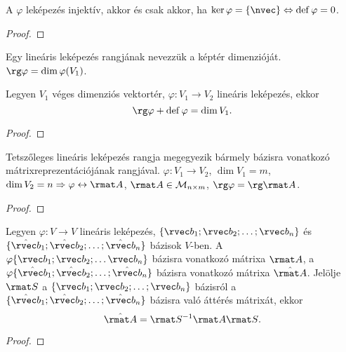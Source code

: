 \begin{statement}
  A $\varphi$ leképezés injektív, akkor és csak akkor, ha
  $\ker \varphi = \{ \nvec \} \Leftrightarrow \operatorname{def} \varphi = 0$.

  \begin{proof}
    \vspace{6em}
  \end{proof}
\end{statement}

\begin{definition}
  Egy lineáris leképezés rangjának nevezzük a képtér dimenzióját.
  $\rg \varphi = \dim \varphi(V_1)$.
\end{definition}

\begin{theorem}
  Legyen $V_1$ véges dimenziós vektortér, $\varphi: V_1 \rightarrow V_2$
  lineáris leképezés, ekkor
  $$
    \rg \varphi + \operatorname{def} \varphi = \dim V_1
    \text.
  $$

  \begin{proof}
    \vspace{6em}
  \end{proof}
\end{theorem}

\begin{statement}
  Tetszőleges lineáris leképezés rangja megegyezik bármely bázisra vonatkozó
  mátrixreprezentációjának rangjával. $\varphi: V_1 \rightarrow V_2$, $\dim V_1
    = m$, $\dim V_2 = n \Rightarrow \varphi \leftrightarrow \rmat A$, $\rmat A
    \in \mathcal M_{n \times m}$, $\rg \varphi = \rg \rmat A$.

  \begin{proof}
    \vspace{6em}
  \end{proof}
\end{statement}

\begin{theorem}
  Legyen $\varphi: V \rightarrow V$ lineáris leképezés,
  $\{ \rvec b_1; \rvec b_2; \ldots; \rvec b_n \}$ és $\{ \hat{\rvec b}_1;
    \hat{\rvec b}_2; \ldots; \hat{\rvec b}_n \}$ bázisok $V$-ben. A
  $\varphi \{ \rvec b_1; \rvec b_2; \ldots \rvec b_n \}$ bázisra vonatkozó
  mátrixa $\rmat A$, a $\varphi \{ \hat{\rvec b}_1; \hat{\rvec b}_2; \ldots;
    \hat{\rvec b}_n \}$ bázisra vonatkozó mátrixa $\hat{\rmat A}$. Jelölje
  $\rmat S$ a $\{ \rvec b_1; \rvec b_2; \ldots; \rvec b_n \}$ bázisról a
  $\{ \hat{\rvec b}_1; \hat{\rvec b}_2; \ldots; \hat{\rvec b}_n \}$ bázisra
  való áttérés mátrixát, ekkor
  $$
    \hat{\rmat A} = \rmat S^{-1} \rmat A \rmat S
    \text.
  $$
  \begin{proof}
    \vspace{10em}
  \end{proof}
\end{theorem}

